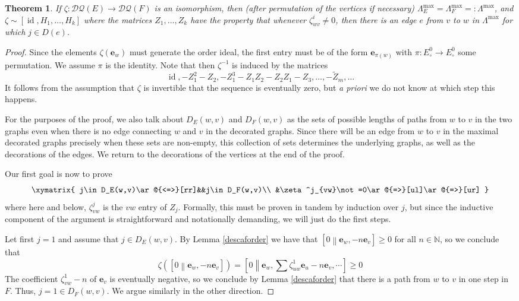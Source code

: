 \documentclass[12pt]{amsbook}%
\newcommand{\ee}{{\mathbf e}}
\newtheorem{theor}{Theorem}[section]
\theoremstyle{defin}
\theoremstyle{remark}
\numberwithin{equation}{chapter}
\numberwithin{theor}{section}
\newcommand{\NN}{\mathbb{N}}
\newcommand{\DQ}{\mathcal{DQ}}
\newcommand{\id}{\operatorname{id}}
\newcommand{\oXe}[2]{\left[#1\left\|{#2}\right.\right]}
\newcommand{\singX}{{\circ}}
\begin{document}
\begin{theor}\label{AFstable}
If $\zeta:\DQ(E)\to \DQ(F)$ is an isomorphism, then (after permutation of the vertices if necessary) $\Lambda^{\max}_E= \Lambda^{\max}_F=:\Lambda^{\max}$, and $\zeta\sim [\id, H_1,\dots, H_k]$ where the matrices $Z_1,\dots, Z_k$ have the property that whenever $\zeta^i_{wv}\not=0$, then there is an edge $e$ from $v$ to $w$ in $\Lambda^{\max}$ for which $j\in D(e)$.
\end{theor}
\begin{proof}
Since the elements $\zeta(\ee_w)$ must generate the order ideal, the first entry must be of the form $\ee_{\pi(w)}$ with $\pi:E_\singX^0\to E_\singX^0$ some permutation. We assume $\pi$ is the identity. Note  that then $\zeta^{-1}$ is induced by the matrices
\begin{equation}\label{inversezeta}
\id,-Z_1^2-Z_2,-Z_1^3-Z_1Z_2-Z_2Z_1-Z_3,\dots,-\widetilde{Z}_m,\dots
\end{equation}
It follows from the assumption that $\zeta$ is invertible that the sequence is eventually zero, but \emph{a priori} we do not know at which step this happens.
 
For the purposes of the proof, we also talk about $D_E(w,v)$ and $D_F(w,v)$ as the sets of possible lengths of paths from $w$ to $v$ in the two graphs even when there is no edge connecting $w$ and $v$ in the decorated graphs. Since there will be an edge from $w$ to $v$ in the maximal decorated graphs precisely when these sets are non-empty, this collection of sets determines the underlying graphs, as well as the decorations of the edges. We return to the decorations of the vertices at the end of the proof.

Our first goal is now to prove
\begin{equation}\label{ih}
\xymatrix{
j\in D_E(w,v)\ar@{<=>}[rr]&&j\in D_F(w,v)\\
&\zeta^j_{vw}\not=0\ar@{=>}[ul]\ar@{=>}[ur]
}
\end{equation}
where here and below, $\zeta^j_{vw}$ is the $vw$ entry of $Z_j$.
Formally, this must be proven in tandem by induction over $j$, but since the inductive component of the argument is straightforward and notationally demanding, we will just do the first steps.

Let first $j=1$ and assume that $j\in D_E(w,v)$. By Lemma \ref{descaforder} we have that $\oXe{0}{\ee_w,-n\ee_v}\geq 0$ for all $n\in \NN$, so we conclude that
\[
\zeta( \oXe{0}{\ee_w,-n\ee_v})=\oXe{0}{\textstyle \ee_w,\sum\zeta^1_{uw}\ee_u-n\ee_v,\cdots}\geq 0
\]
The coefficient $\zeta^1_{vw}-n$ of $\ee_v$ is eventually negative, so we conclude  by Lemma \ref{descaforder} that there is a path from $w$ to $v$ in one step in $F$. Thus, $j=1\in D_F(w,v)$. We argue similarly in the other direction.


\end{proof}
\end{document}
